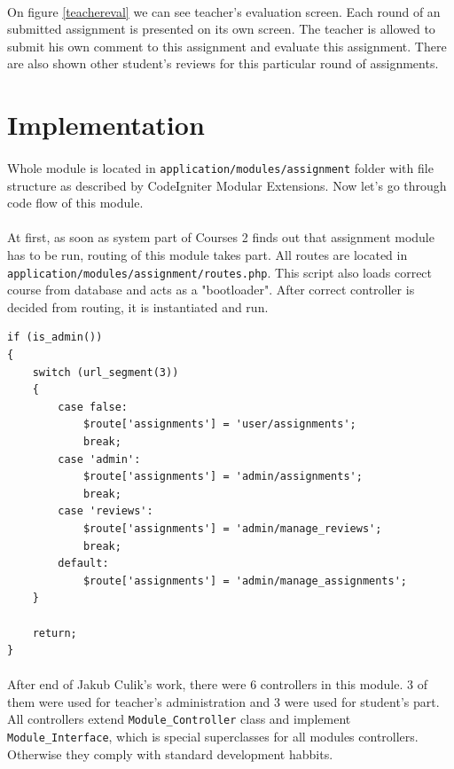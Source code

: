 \paragraph{}
On figure \ref{teachereval} we can see teacher's evaluation screen. Each round of an submitted assignment is presented on its own screen. The teacher is allowed to submit his own comment to this assignment and evaluate this assignment. There are also shown other student's reviews for this particular round of assignments. 

\section{Implementation}
\paragraph{}
Whole module is located in \texttt{application/modules/assignment} folder with file structure as described by CodeIgniter Modular Extensions. Now let's go through code flow of this module.

\paragraph{}
At first, as soon as system part of Courses 2 finds out that assignment module has to be run, routing of this module takes part. All routes are located in \texttt{application/modules/assignment/routes.php}. This script also loads correct course from database and acts as a "bootloader". After correct controller is decided from routing, it is instantiated and run.

\begin{lstlisting}[label={assrouting}, caption={Routing in assignments module for administrator}]
if (is_admin())
{
    switch (url_segment(3))
    {
        case false:
            $route['assignments'] = 'user/assignments';
            break;
        case 'admin':
            $route['assignments'] = 'admin/assignments';
            break;
        case 'reviews':
            $route['assignments'] = 'admin/manage_reviews';
            break;
        default:
            $route['assignments'] = 'admin/manage_assignments';
    }

    return;
}
\end{lstlisting}

\paragraph{}
After end of Jakub Culik's \cite{culik} work, there were 6 controllers in this module. 3 of them were used for teacher's administration and 3 were used for student's part. All controllers extend \texttt{Module\_Controller} class and implement \texttt{Module\_Interface}, which is special superclasses for all modules controllers. Otherwise they comply with standard development habbits.

